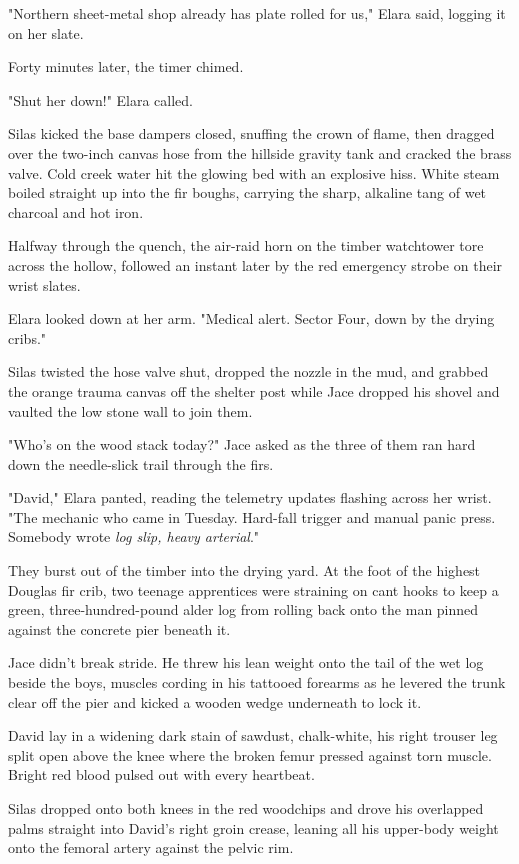 "Northern sheet-metal shop already has plate rolled for us," Elara said, logging it on her slate.

Forty minutes later, the timer chimed.

"Shut her down!" Elara called.

Silas kicked the base dampers closed, snuffing the crown of flame, then dragged over the two-inch canvas hose from the hillside gravity tank and cracked the brass valve. Cold creek water hit the glowing bed with an explosive hiss. White steam boiled straight up into the fir boughs, carrying the sharp, alkaline tang of wet charcoal and hot iron.

Halfway through the quench, the air-raid horn on the timber watchtower tore across the hollow, followed an instant later by the red emergency strobe on their wrist slates.

Elara looked down at her arm. "Medical alert. Sector Four, down by the drying cribs."

Silas twisted the hose valve shut, dropped the nozzle in the mud, and grabbed the orange trauma canvas off the shelter post while Jace dropped his shovel and vaulted the low stone wall to join them.

"Who's on the wood stack today?" Jace asked as the three of them ran hard down the needle-slick trail through the firs.

"David," Elara panted, reading the telemetry updates flashing across her wrist. "The mechanic who came in Tuesday. Hard-fall trigger and manual panic press. Somebody wrote \textit{log slip, heavy arterial}."

They burst out of the timber into the drying yard. At the foot of the highest Douglas fir crib, two teenage apprentices were straining on cant hooks to keep a green, three-hundred-pound alder log from rolling back onto the man pinned against the concrete pier beneath it.

Jace didn't break stride. He threw his lean weight onto the tail of the wet log beside the boys, muscles cording in his tattooed forearms as he levered the trunk clear off the pier and kicked a wooden wedge underneath to lock it.

David lay in a widening dark stain of sawdust, chalk-white, his right trouser leg split open above the knee where the broken femur pressed against torn muscle. Bright red blood pulsed out with every heartbeat.

Silas dropped onto both knees in the red woodchips and drove his overlapped palms straight into David's right groin crease, leaning all his upper-body weight onto the femoral artery against the pelvic rim.

